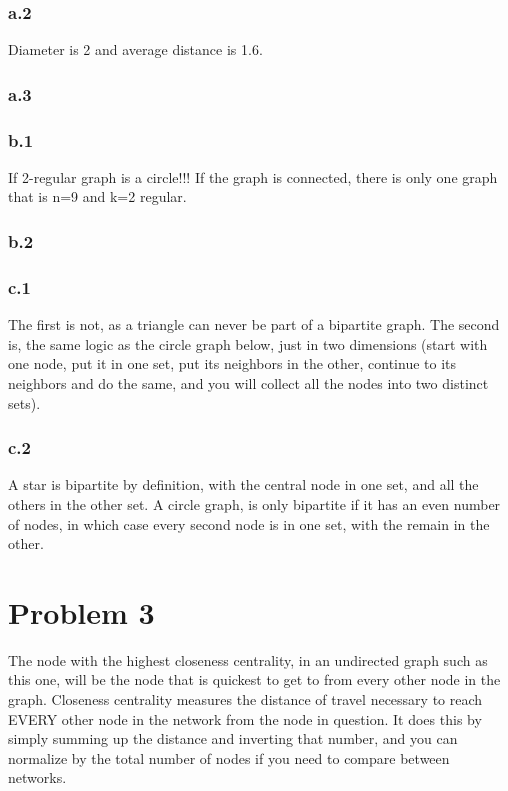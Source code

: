 \documentclass[a4paper,12pt]{article}
\begin{document}
\subsubsection*{a.2}
Diameter is 2 and average distance is 1.6.

\subsubsection*{a.3}

\subsubsection*{b.1}
If 2-regular graph is a circle!!! If the graph is connected, there is only one graph that is n=9 and k=2 regular.

\subsubsection*{b.2}


\subsubsection*{c.1}
The first is not, as a triangle can never be part of a bipartite graph. The second is, the same logic as the circle graph below, just in two dimensions (start with one node, put it in one set, put its neighbors in the other, continue to its neighbors and do the same, and you will collect all the nodes into two distinct sets).

\subsubsection*{c.2}
A star is bipartite by definition, with the central node in one set, and all the others in the other set. A circle graph, is only bipartite if it has an even number of nodes, in which case every second node is in one set, with the remain in the other.



\section*{Problem 3}
The node with the highest closeness centrality, in an undirected graph such as this one, will be the node that is quickest to get to from every other node in the graph. Closeness centrality measures the distance of travel necessary to reach EVERY other node in the network from the node in question. It does this by simply summing up the distance and inverting that number, and you can normalize by the total number of nodes if you need to compare between networks.
\end{document}
